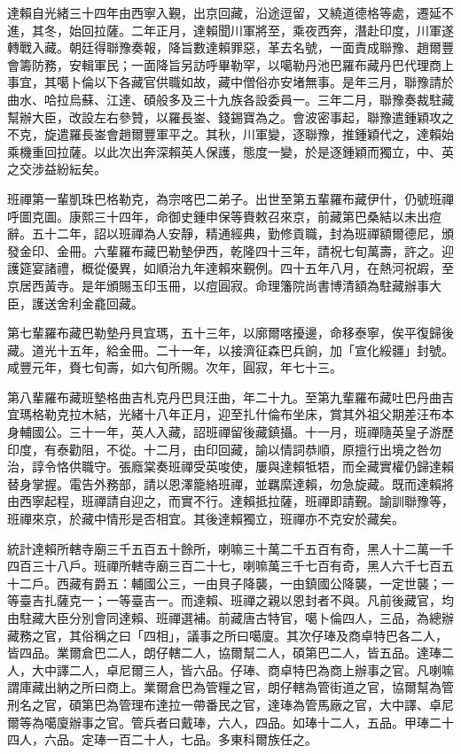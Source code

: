 \begin{pinyinscope}
達賴自光緒三十四年由西寧入覲，出京回藏，沿途逗留，又繞道德格等處，遷延不進，其冬，始回拉薩。二年正月，達賴聞川軍將至，乘夜西奔，潛赴印度，川軍遂轉戰入藏。朝廷得聯豫奏報，降旨數達賴罪惡，革去名號，一面責成聯豫、趙爾豐會籌防務，安輯軍民；一面降旨另訪呼畢勒罕，以噶勒丹池巴羅布藏丹巴代理商上事宜，其噶卜倫以下各藏官供職如故，藏中僧俗亦安堵無事。是年三月，聯豫請於曲水、哈拉烏蘇、江達、碩般多及三十九族各設委員一。三年二月，聯豫奏裁駐藏幫辦大臣，改設左右參贊，以羅長崟、錢錫寶為之。會波密事起，聯豫遣鍾穎攻之不克，旋遣羅長崟會趙爾豐軍平之。其秋，川軍變，逐聯豫，推鍾穎代之，達賴始乘機重回拉薩。以此次出奔深賴英人保護，態度一變，於是逐鍾穎而獨立，中、英之交涉益紛紜矣。

班禪第一輩凱珠巴格勒克，為宗喀巴二弟子。出世至第五輩羅布藏伊什，仍號班禪呼圖克圖。康熙三十四年，命御史鍾申保等賚敕召來京，前藏第巴桑結以未出痘辭。五十二年，詔以班禪為人安靜，精通經典，勤修貢職，封為班禪額爾德尼，頒發金印、金冊。六輩羅布藏巴勒墊伊西，乾隆四十三年，請祝七旬萬壽，許之。迎護筵宴諸禮，概從優異，如順治九年達賴來覲例。四十五年八月，在熱河祝嘏，至京居西黃寺。是年頒賜玉印玉冊，以痘圓寂。命理籓院尚書博清額為駐藏辦事大臣，護送舍利金龕回藏。

第七輩羅布藏巴勒墊丹貝宜瑪，五十三年，以廓爾喀擾邊，命移泰寧，俟平復歸後藏。道光十五年，給金冊。二十一年，以接濟征森巴兵餉，加「宣化綏疆」封號。咸豐元年，賚七旬壽，如六旬所賜。次年，圓寂，年七十三。

第八輩羅布藏班墊格曲吉札克丹巴貝汪曲，年二十九。至第九輩羅布藏吐巴丹曲吉宜瑪格勒克拉木結，光緒十八年正月，迎至扎什倫布坐床，賞其外祖父期差汪布本身輔國公。三十一年，英人入藏，詔班禪留後藏鎮攝。十一月，班禪隨英皇子游歷印度，有泰勸阻，不從。十二月，由印回藏，諭以情詞恭順，原擅行出境之咎勿治，諄令恪供職守。張廕棠奏班禪受英唆使，屢與達賴牴牾，而全藏實權仍歸達賴替身掌握。電告外務部，請以恩澤籠絡班禪，並羈縻達賴，勿急旋藏。既而達賴將由西寧起程，班禪請自迎之，而實不行。達賴抵拉薩，班禪即請覲。諭訓聯豫等，班禪來京，於藏中情形是否相宜。其後達賴獨立，班禪亦不克安於藏矣。

統計達賴所轄寺廟三千五百五十餘所，喇嘛三十萬二千五百有奇，黑人十二萬一千四百三十八戶。班禪所轄寺廟三百二十七，喇嘛萬三千七百有奇，黑人六千七百五十二戶。西藏有爵五：輔國公三，一由貝子降襲，一由鎮國公降襲，一定世襲；一等臺吉扎薩克一；一等臺吉一。而達賴、班禪之親以恩封者不與。凡前後藏官，均由駐藏大臣分別會同達賴、班禪選補。前藏唐古特官，噶卜倫四人，三品，為總辦藏務之官，其俗稱之曰「四相」，議事之所曰噶廈。其次仔琫及商卓特巴各二人，皆四品。業爾倉巴二人，朗仔轄二人，協爾幫二人，碩第巴二人，皆五品。達琫二人，大中譯二人，卓尼爾三人，皆六品。仔琫、商卓特巴為商上辦事之官。凡喇嘛謂庫藏出納之所曰商上。業爾倉巴為管糧之官，朗仔轄為管街道之官，協爾幫為管刑名之官，碩第巴為管理布達拉一帶番民之官，達琫為管馬廠之官，大中譯、卓尼爾等為噶廈辦事之官。管兵者曰戴琫，六人，四品。如琫十二人，五品。甲琫二十四人，六品。定琫一百二十人，七品。多東科爾族任之。


\end{pinyinscope}
